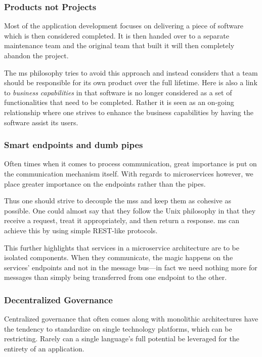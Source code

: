 \subsubsection{Products not Projects}

Most of the application development focuses on delivering a piece of
software which is then considered completed. It is then handed over to
a separate maintenance team and the original team that built it will
then completely abandon the project.

The \gls{ms} philosophy tries to avoid this approach and instead
considers that a team should be responsible for its own product over
the full lifetime. Here is also a link to \textit{business
capabilities} in that software is no longer considered as a set of
functionalities that need to be completed. Rather it is seen as an
on-going relationship where one strives to enhance the business
capabilities by having the software assist its users.

\subsubsection{Smart endpoints and dumb pipes}

Often times when it comes to process communication, great importance
is put on the communication mechanism itself. With regards to
microservices however, we place greater importance on the endpoints
rather than the pipes.

Thus one should strive to decouple the \glspl{ms} and keep them as
cohesive as possible. One could almost say that they follow the Unix
philosophy in that they receive a request, treat it appropriately, and
then return a response. \gls{ms} can achieve this by using simple
REST-like protocols.

This further highlights that services in a microservice architecture
are to be isolated components. When they communicate, the
magic happens on the services' endpoints and not in the message
bus---in fact we need nothing more for messages than simply being
transferred from one endpoint to the other.

\subsubsection{Decentralized Governance}

Centralized governance that often comes along with monolithic
architectures have the tendency to standardize on single technology
platforms, which can be restricting. Rarely can a single language's
full potential be leveraged for the entirety of an application.

